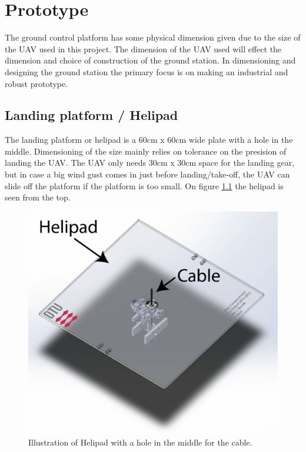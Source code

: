 
\chapter{Prototype}
The ground control platform has some physical dimension given due to the size of the UAV used in this project. The dimension of the UAV used will effect the dimension and choice of construction of the ground station. In dimensioning and designing the ground station the primary focus is on making an industrial and robust prototype. 


\section{Landing platform / Helipad}
The landing platform or helipad is a 60cm x 60cm wide plate with a hole in the middle. Dimensioning of the size mainly relies on tolerance on the presision of landing the UAV. The UAV only needs 30cm x 30cm space for the landing gear, but in case a big wind gust comes in just before landing/take-off, the UAV can slide off the platform if the platform is too small. On figure \ref{fig:helipad} the helipad is seen from the top.

\begin{figure}[H]
\centering
\includegraphics[scale=0.75]{graphics/cad/toplevel.png}
\caption{Illustration of Helipad with a hole in the middle for the cable.}
\label{fig:helipad}
\end{figure}

